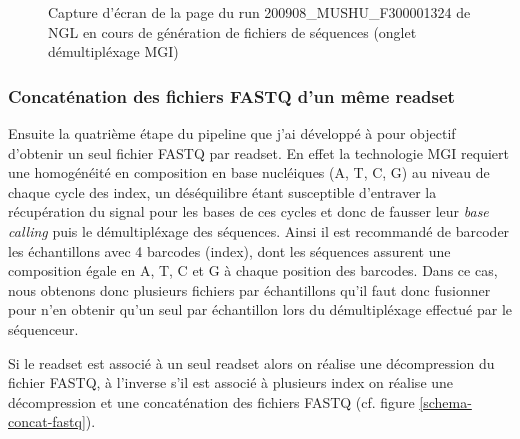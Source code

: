 \begin{figure}[H]
    \centering
    \caption{\footnotesize{Capture d'écran de la page du run 200908\_MUSHU\_F300001324 de NGL en cours de génération de fichiers de séquences (onglet \og démultipléxage MGI\fg{})}}
    \label{top-index}
\end{figure}

\subsubsection*{Concaténation des fichiers FASTQ d'un même readset}
Ensuite la quatrième étape du pipeline que j'ai développé à pour objectif d'obtenir un seul fichier FASTQ par readset.
En effet la technologie MGI requiert une homogénéité en composition en base nucléiques (A, T, C, G) au niveau de chaque cycle des index, un déséquilibre étant susceptible d'entraver la récupération du signal pour les bases de ces cycles et donc de fausser leur \emph{base calling} puis le démultipléxage des séquences.
Ainsi il est recommandé de \og barcoder \fg{} les échantillons avec 4 barcodes (index), dont les séquences assurent une composition égale en A, T, C et G à chaque position des barcodes.
Dans ce cas, nous obtenons donc plusieurs fichiers par échantillons qu'il faut donc fusionner pour n'en obtenir qu'un seul par échantillon lors du démultipléxage effectué par le séquenceur.

Si le readset est associé à un seul readset alors on réalise une décompression du fichier FASTQ, à l'inverse s'il est associé à plusieurs index on réalise une décompression et une concaténation des fichiers FASTQ (cf. figure \ref{schema-concat-fastq}).

